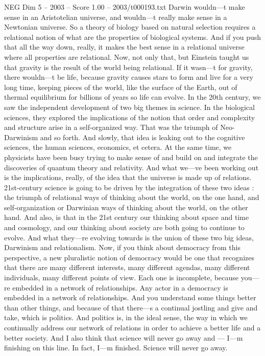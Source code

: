 \begin{textsample}{NEG Dim 5 – 2003 – Score 1.00 – 2003/t000193.txt}
Darwin wouldn—t make sense in an Aristotelian universe, and wouldn—t really make sense in a Newtonian universe.
So a theory of biology based on natural selection requires a relational notion of what are the properties of biological systems.
And if you push that all the way down, really, it makes the best sense in a relational universe where all properties are relational.
Now, not only that, but Einstein taught us that gravity is the result of the world being relational.
If it wasn—t for gravity, there wouldn—t be life, because gravity causes stars to form and live for a very long time, keeping pieces of the world, like the surface of the Earth, out of thermal equilibrium for billions of years so life can evolve.
In the 20th century, we saw the independent development of two big themes in science.
In the biological sciences, they explored the implications of the notion that order and complexity and structure arise in a self-organized way.
That was the triumph of Neo-Darwinism and so forth.
And slowly, that idea is leaking out to the cognitive sciences, the human sciences, economics, et cetera.
At the same time, we physicists have been busy trying to make sense of and build on and integrate the discoveries of quantum theory and relativity.
And what we—ve been working out is the implications, really, of the idea that the universe is made up of relations. 21st-century science is going to be driven by the integration of these two ideas : the triumph of relational ways of thinking about the world, on the one hand, and self-organization or Darwinian ways of thinking about the world, on the other hand.
And also, is that in the 21st century our thinking about space and time and cosmology, and our thinking about society are both going to continue to evolve.
And what they—re evolving towards is the union of these two big ideas, Darwinism and relationalism.
Now, if you think about democracy from this perspective, a new pluralistic notion of democracy would be one that recognizes that there are many different interests, many different agendas, many different individuals, many different points of view.
Each one is incomplete, because you—re embedded in a network of relationships.
Any actor in a democracy is embedded in a network of relationships.
And you understand some things better than other things, and because of that there—s a continual jostling and give and take, which is politics.
And politics is, in the ideal sense, the way in which we continually address our network of relations in order to achieve a better life and a better society.
And I also think that science will never go away and — I—m finishing on this line.
In fact, I—m finished.
Science will never go away.

\end{textsample}
